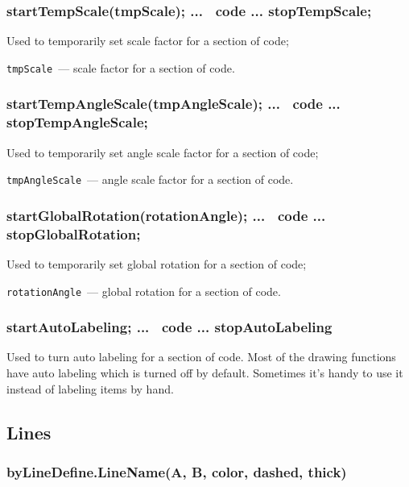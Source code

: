 \subsubsection{startTempScale(tmpScale); ... \METAPOST\ code ... stopTempScale;}\label{startTempScale}

	Used to temporarily set scale factor for a section of code;

	\texttt{tmpScale}~— scale factor for a section of code.
		
\subsubsection{startTempAngleScale(tmpAngleScale); ... \METAPOST\ code ... stopTempAngleScale;}\label{startTempAngleScale}

	Used to temporarily set angle scale factor for a section of code;

	\texttt{tmpAngleScale}~— angle scale factor for a section of code.

\subsubsection{startGlobalRotation(rotationAngle); ... \METAPOST\ code ... stopGlobalRotation;}\label{startGlobalRotation}

	Used to temporarily set global rotation for a section of code;

	\texttt{rotationAngle}~— global rotation for a section of code.
	
\subsubsection{startAutoLabeling; ... \METAPOST\ code ... stopAutoLabeling}\label{startAutoLabeling}

	Used to turn auto labeling for a section of code. Most of the drawing functions have auto labeling which is turned off by default. Sometimes it's handy to use it instead of labeling items by hand.



\subsection{Lines}


\subsubsection{byLineDefine.LineName(A, B, color, dashed, thick)}\label{byLineDefine}

